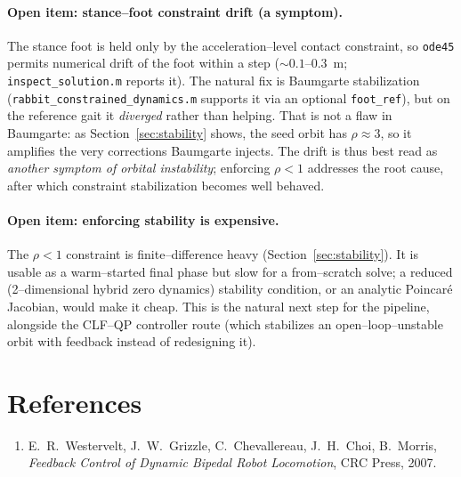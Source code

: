 \documentclass[11pt,a4paper]{article}
\newcommand{\code}[1]{\texttt{#1}}          %
\newcommand{\fname}[1]{\texttt{#1}}          %
\begin{document}
\paragraph{Open item: stance--foot constraint drift (a symptom).}
The stance foot is held only by the acceleration--level contact constraint, so
\code{ode45} permits numerical drift of the foot within a step
($\sim 0.1$--$0.3$~m; \fname{inspect\_solution.m} reports it). The natural fix
is Baumgarte stabilization (\fname{rabbit\_constrained\_dynamics.m} supports it
via an optional \code{foot\_ref}), but on the reference gait it \emph{diverged}
rather than helping. That is not a flaw in Baumgarte: as
Section~\ref{sec:stability} shows, the seed orbit has $\rho\approx 3$, so it
amplifies the very corrections Baumgarte injects. The drift is thus best read as
\emph{another symptom of orbital instability}; enforcing $\rho<1$ addresses the
root cause, after which constraint stabilization becomes well behaved.

\paragraph{Open item: enforcing stability is expensive.}
The $\rho<1$ constraint is finite--difference heavy (Section~\ref{sec:stability}).
It is usable as a warm--started final phase but slow for a from--scratch solve; a
reduced (2--dimensional hybrid zero dynamics) stability condition, or an
analytic Poincar\'e Jacobian, would make it cheap. This is the natural next step
for the pipeline, alongside the CLF--QP controller route (which stabilizes an
open--loop--unstable orbit with feedback instead of redesigning it).

\section*{References}
\begin{enumerate}
  \item E.~R.~Westervelt, J.~W.~Grizzle, C.~Chevallereau, J.~H.~Choi, B.~Morris,
        \emph{Feedback Control of Dynamic Bipedal Robot Locomotion},
        CRC Press, 2007.
\end{enumerate}
\end{document}
